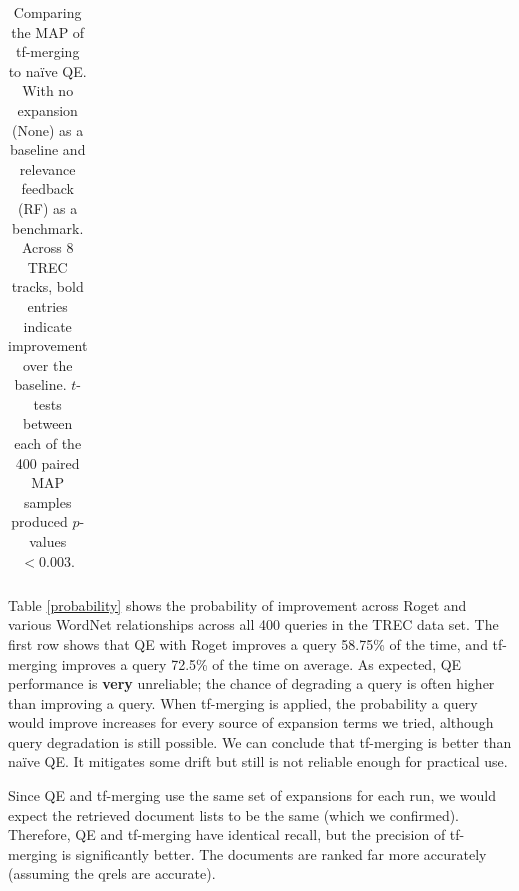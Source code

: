 \begin{table}
{\begin{tabular}{|l|l|r|r|r|r|r|r|r|r|}
    \end{tabular}
}

\caption{
Comparing the MAP of tf-merging to na{\"i}ve QE. With no expansion (None) as a baseline and relevance feedback (RF) as a benchmark. Across 8 TREC tracks, bold entries indicate improvement over the baseline. $t$-tests between each of the 400 paired MAP samples produced $p$-values $< 0.003$.}

\label{mapall}
\end{table}

Table \ref{probability} shows the probability of improvement across Roget and various WordNet relationships across all 400 queries in the TREC data set. The first row shows that QE with Roget improves a query 58.75\% of the time, and tf-merging improves a query 72.5\% of the time on average. As expected, QE performance is \textbf{very} unreliable; the chance of degrading a query is often higher than improving a query. When tf-merging is applied, the probability a query would improve increases for every source of expansion terms we tried, although query degradation is still possible. We can conclude that tf-merging is better than na{\"i}ve QE. It mitigates some drift but still is not reliable enough for practical use.

Since QE and tf-merging use the same set of expansions for each run, we would expect the retrieved document lists to be the same (which we confirmed). Therefore, QE and tf-merging have identical recall, but the precision of tf-merging is significantly better. The documents are ranked far more accurately (assuming the qrels are accurate).



